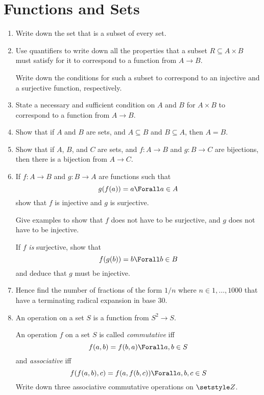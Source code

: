 \section{Functions and Sets}

\begin{enumerate}
 \item
  Write down the set that is a subset of every set.
 \item
  Use quantifiers to write down all the properties that a subset
  \(R \subseteq A \times B\) must satisfy for it to correspond to a function
  from \(A \to B\).

  Write down the conditions for such a subset to correspond to an injective and
  a surjective function, respectively.
 \item
  State a necessary and sufficient condition on \(A\) and \(B\) for
  \(A \times B\) to correspond to a function from \(A \to B\).
 \item
  Show that if \(A\) and \(B\) are sets, and \(A \subseteq B\) and
  \(B \subseteq A\), then \(A = B\).
 \item
  Show that if \(A\), \(B\), and \(C\) are sets, and
  \(f : A \to B\) and \(g : B \to C\) are bijections, then there is a bijection
  from \(A \to C\).
 \item
  If \(f: A \to B\) and \(g: B \to A\) are functions such that
  \begin{equation*}
   g(f(a)) = a \Forall a \in A
  \end{equation*}
  show that \(f\) is injective and \(g\) is surjective.

  Give examples to show that \(f\) does not have to be surjective, and \(g\)
  does not have to be injective.

  If \(f\) \emph{is} surjective, show that
  \begin{equation*}
   f(g(b)) = b \Forall b \in B
  \end{equation*}
  and deduce that \(g\) must be injective.
 \item
  Hence find the number of fractions of the form \(1 / n\) where
  \(n \in {1, \dotsc, 1000}\) that have a terminating radical expansion in base
  30.
 \item
  An operation on a set \(S\) is a function from \(S^2 \to S\).

  An operation \(f\) on a set \(S\) is called \emph{commutative} iff
  \begin{equation*}
   f(a, b) = f(b, a) \Forall a, b \in S
  \end{equation*}
  and \emph{associative} iff
  \begin{equation*}
   f(f(a, b), c) = f(a, f(b, c)) \Forall a, b, c \in S
  \end{equation*}
  Write down three associative commutative operations on \(\Integers\).


\end{enumerate}
